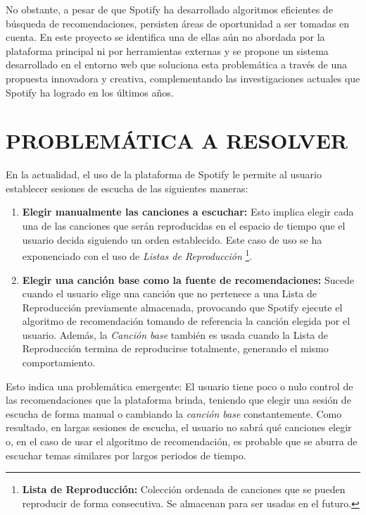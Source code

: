 \newpage
\thispagestyle{plain}

\vspace*{0.2cm}

No obstante, a pesar de que Spotify ha desarrollado algoritmos eficientes de búsqueda de recomendaciones, persisten áreas de oportunidad a ser tomadas en cuenta. En este proyecto se identifica una de ellas aún no abordada por la plataforma principal ni por herramientas externas y se propone un sistema desarrollado en el entorno web que soluciona esta problemática a través de una propuesta innovadora y creativa, complementando las investigaciones actuales que Spotify ha logrado en los últimos años.

\section{PROBLEMÁTICA A RESOLVER}

En la actualidad, el uso de la plataforma de Spotify le permite al usuario establecer sesiones de escucha de las siguientes maneras:

\begin{enumerate}
    \item \textbf{Elegir manualmente las canciones a escuchar:} Esto implica elegir cada una de las canciones que serán reproducidas en el espacio de tiempo que el usuario decida siguiendo un orden establecido. Este caso de uso se ha exponenciado con el uso de \textit{Listas de Reproducción} \footnote{\textbf{Lista de Reproducción: } Colección ordenada de canciones que se pueden reproducir de forma consecutiva. Se almacenan para ser usadas en el futuro.}.

    \item \textbf{Elegir una canción base como la fuente de recomendaciones:} Sucede cuando el usuario elige una canción que no pertenece a una Lista de Reproducción previamente almacenada, provocando que Spotify ejecute el algoritmo de recomendación tomando de referencia la canción elegida por el usuario. Además, la \textit{Canción base} también es usada cuando la Lista de Reproducción termina de reproducirse totalmente, generando el mismo comportamiento.
\end{enumerate}

Esto indica una problemática emergente: El usuario tiene poco o nulo control de las recomendaciones que la plataforma brinda, teniendo que elegir una sesión de escucha de forma manual o cambiando la \textit{canción base} constantemente. Como resultado, en largas sesiones de escucha, el usuario no sabrá qué canciones elegir o, en el caso de usar el algoritmo de recomendación, es probable que se aburra de escuchar temas similares por largos periodos de tiempo.


